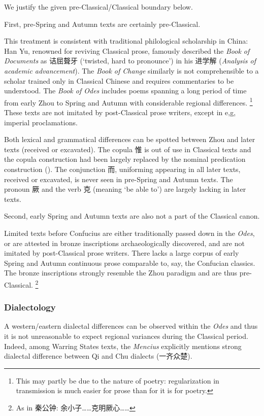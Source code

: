 \documentclass[UTF8, a4paper, oneside, scheme=plain, 12pt]{ctexrep}
\newcommand{\work}[1]{\textit{#1}}
\newcommand{\translate}[1]{`#1'}
\begin{document}
We justify the given pre-Classical/Classical boundary below.

First, pre-Spring and Autumn texts are certainly pre-Classical.

This treatment is consistent with traditional philological scholarship in China:
Han Yu, renowned for reviving Classical prose, famously described the \work{Book of Documents} as 诘屈聱牙 (\translate{twisted, hard to pronounce}) in his 进学解 (\work{Analysis of academic advancement}).
The \work{Book of Change} similarly is not comprehensible to a scholar trained only in Classical Chinese and requires commentaries to be understood.
The \work{Book of Odes} includes poems spanning a long period of time from early Zhou to Spring and Autumn with considerable regional differences.%
\footnote{
    This may partly be due to the nature of poetry:
    regularization in transmission is much easier for prose than for it is for poetry.
}
These texts are not imitated by post-Classical prose writers, except in e,g, imperial proclamations.

Both lexical and grammatical differences can be spotted between Zhou and later texts (received or excavated).
The copula 惟 is out of use in Classical texts 
and the copula construction had been largely replaced by the nominal predication construction
().
The conjunction 而, uniforming appearing in all later texts, received or excavated, is never seen in pre-Spring and Autumn texts.
The pronoun 厥 and the verb 克 (meaning \translate{be able to}) are largely lacking in later texts.

Second, early Spring and Autumn texts are also not a part of the Classical canon.

Limited texts before Confucius are either traditionally passed down in the \work{Odes},
or are attested in bronze inscriptions archaeologically discovered,
and are not imitated by post-Classical prose writers.
There lacks a large corpus of early Spring and Autumn continuous prose comparable to, say, the Confucian classics. 
The bronze inscriptions strongly resemble the Zhou paradigm and are thus pre-Classical.%
\footnote{
    As in 秦公钟: 余小子……克明厥心……
}



\subsubsection{Dialectology}\label{sec:introduction.text.pre-han.dialect}

A western/eastern dialectal differences can be observed within the \work{Odes} \citep{ma2025ji}
and thus it is not unreasonable to expect regional variances during the Classical period.
Indeed, among Warring States texts, the \work{Mencius} explicitly mentions strong dialectal difference between Qi and Chu dialects (一齐众楚). 
\end{document}
